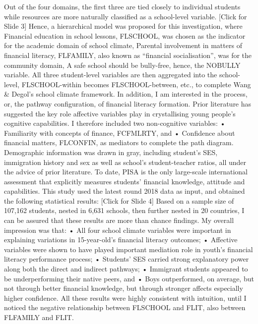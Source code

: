 Out of the four domains, the first three are tied closely to individual students while resources are more naturally classified as a school-level variable.
[Click for Slide 3]
Hence, a hierarchical model was proposed for this investigation, where
Financial education in school lessons, FLSCHOOL, was chosen as the indicator for the academic domain of school climate,
Parental involvement in matters of financial literacy, FLFAMILY, also known as “financial socialisation”, was for the community domain,
A safe school should be bully-free, hence, the NOBULLY variable.
All three student-level variables are then aggregated into the school-level, FLSCHOOL-within becomes FLSCHOOL-between, etc., to complete Wang & Degol’s school climate framework.
In addition, I am interested in the process, or, the pathway configuration, of financial literacy formation. Prior literature has suggested the key role affective variables play in crystallising young people’s cognitive capabilities. I therefore included two non-cognitive variables:
•	Familiarity with concepts of finance, FCFMLRTY, and
•	Confidence about financial matters, FLCONFIN,
as mediators to complete the path diagram. Demographic information was drawn in gray, including student’s SES, immigration history and sex as well as school’s student-teacher ratios, all under the advice of prior literature.
To date, PISA is the only large-scale international assessment that explicitly measures students’ financial knowledge, attitude and capabilities. This study used the latest round 2018 data as input, and obtained the following statistical results:
[Click for Slide 4]
Based on a sample size of 107,162 students, nested in 6,631 schools, then further nested in 20 countries, I can be assured that these results are more than chance findings.
My overall impression was that:
•	All four school climate variables were important in explaining variations in 15-year-old’s financial literacy outcomes;
•	Affective variables were shown to have played important mediation role in youth’s financial literacy performance process;
•	Students’ SES carried strong explanatory power along both the direct and indirect pathways;
•	Immigrant students appeared to be underperforming their native peers, and
•	Boys outperformed, on average, but not through better financial knowledge, but through stronger affects especially higher confidence.
All these results were highly consistent with intuition, until I noticed the negative relationship between FLSCHOOL and FLIT, also between FLFAMILY and FLIT.
